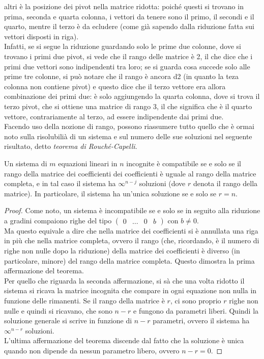 altri è la posizione dei pivot nella matrice ridotta: poiché questi si
trovano in prima, seconda e quarta colonna, i vettori da tenere sono il
primo, il secondi e il quarto, mentre il terzo è da ecludere (come già
sapendo dalla riduzione fatta sui vettori disposti in riga).\\
Infatti, se si segue la riduzione guardando solo le prime due colonne,
dove si trovano i primi due pivot, si vede che il rango delle matrice è
2, il che dice che i primi due vettori sono indipendenti tra loro; se
si guarda cosa succede solo alle prime tre colonne, si può notare che
il rango è ancora d2 (in quanto la teza colonna non contiene pivot) e
questo dice che il terzo vettore era allora combinazione dei primi due:
è solo aggiungendo la quarta colonna, dove si trova il terzo pivot, che
si ottiene una matrice di rango 3, il che significa che è il quarto
vettore, contrariamente al terzo, ad essere indipendente dai primi due.\\
Facendo uso della nozione di rango, possono riassumere tutto quello che
è ormai noto sulla risolubilià di un sistema e sul numero delle sue
soluzioni nel seguente risultato, detto \textit{teorema di
  Rouché-Capelli}.
\begin{teo}
  \label{teo:gauss-jordan1}
  Un sistema di $m$ equazioni lineari in $n$ incognite è compatibile se
  e solo se il rango della matrice dei coefficienti dei coefficienti è
  uguale al rango della matrice completa, e in tal caso il sistema ha
  $\infty^{n-j}$ soluzioni (dove $r$ denota il rango della matrice). In
  particolare, il sistema ha un'unica soluzione se e solo se $r=n$.
\end{teo}
\begin{proof}
  Come noto, un sistema è incompatibile se e solo se in seguito alla
  riduzione a gradini compaiono righe del tipo $
  \left(\begin{array}{ccc|c}
    0&\dots&0&b
  \end{array}\right)
  $ con $b\neq 0$.\\
  Ma questo equivale a dire che nella matrice dei coefficienti si è
  annullata una riga in più che nella matrice completa, ovvero il rango
  (che, ricordando, è il numero di righe non nulle dopo la riduzione)
  della matrice dei coefficienti è diverso (in particolare, minore) del
  rango della matrice completa. Questo dimostra la prima affermazione del
  teorema.\\
  Per quello che riguarda la seconda affermazione, si sà che una volta
  ridotto il sistema si ricava la matrice incognita che compare in ogni
  equazione non nulla in funzione delle rimanenti. Se il rango della
  matrice è $r$, ci sono proprio $r$ righe non nulle e quindi si
  ricavano, che sono $n-r$ e fungono da parametri liberi. Quindi la
  soluzione generale si scrive in funzione di $n-r$ parametri, ovvero il
  sistema ha $\infty^{n-r}$ soluzioni.\\
  L'ultima affermazione del teorema discende dal fatto che la soluzione è
  unica quando non dipende da nessun parametro libero, ovvero $n-r=0.$
\end{proof}
